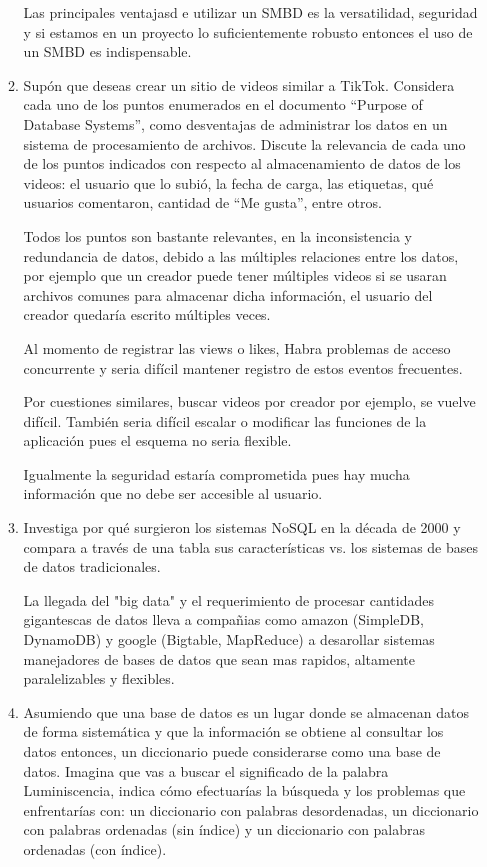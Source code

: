 \documentclass[12pt,a4paper]{article}
\begin{document}
\begin{enumerate}
\begin{enumerate}
			      Las principales ventajasd e utilizar un SMBD es la versatilidad, seguridad y si estamos en un proyecto lo suficientemente 			      robusto entonces el uso de un SMBD es indispensable.
	
				
			\item Supón que deseas crear un sitio de videos similar a TikTok. Considera cada uno de los puntos
				enumerados en el documento “Purpose of Database Systems”, como desventajas de administrar los
				datos en un sistema de procesamiento de archivos. Discute la relevancia de cada uno de los puntos
				indicados con respecto al almacenamiento de datos de los videos: el usuario que lo subió, la fecha de
				carga, las etiquetas, qué usuarios comentaron, cantidad de “Me gusta”, entre otros.
				
			Todos los puntos son bastante relevantes, en la inconsistencia y redundancia de datos, debido a las múltiples relaciones entre los datos, por ejemplo que un creador puede tener múltiples videos si se usaran archivos comunes para almacenar dicha información, el usuario del creador quedaría escrito múltiples veces.

Al momento de registrar las views o likes, Habra problemas de acceso concurrente y seria difícil mantener registro de estos eventos frecuentes.

Por cuestiones similares, buscar videos por creador por ejemplo, se vuelve difícil.
También seria difícil escalar o modificar las funciones de la aplicación pues el esquema no seria flexible.

Igualmente la seguridad estaría comprometida pues hay mucha información que no debe ser accesible al usuario.


			\item Investiga por qué surgieron los sistemas NoSQL en la década de 2000 y compara a través de una tabla
				sus características vs. los sistemas de bases de datos tradicionales.

				La llegada del "big data" y el requerimiento de procesar cantidades gigantescas de datos lleva 
				a compañias como amazon (SimpleDB, DynamoDB) y google (Bigtable, MapReduce) a desarollar sistemas 
				manejadores de bases de datos que sean mas rapidos, altamente paralelizables y flexibles. 

			\item Asumiendo que una base de datos es un lugar donde se almacenan datos de forma sistemática y que
				la información se obtiene al consultar los datos entonces, un diccionario puede considerarse como una
				base de datos. Imagina que vas a buscar el significado de la palabra Luminiscencia, indica cómo
				efectuarías la búsqueda y los problemas que enfrentarías con: un diccionario con palabras
				desordenadas, un diccionario con palabras ordenadas (sin índice) y un diccionario con palabras
				ordenadas (con índice).


\end{enumerate}
\end{enumerate}
\end{document}
